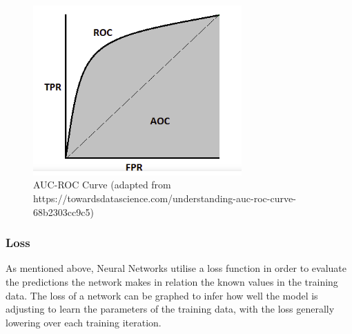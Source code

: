 \documentclass[12pt]{report}
\begin{document}
\vspace{0.5cm}
\begin{figure}[ht!]
	\centering
	\includegraphics[width=8cm]{aucroc}
	\caption{AUC-ROC Curve (adapted from https://towardsdatascience.com/understanding-auc-roc-curve-68b2303cc9c5)}
	\label{fig:aucroc}
\end{figure}

\newpage
\subsubsection{Loss}
\begin{flushleft}
As mentioned above, Neural Networks utilise a loss function in order to evaluate the predictions the network makes in relation the known values in the training data. The loss of a network can be graphed to infer how well the model is adjusting to learn the parameters of the training data, with the loss generally lowering over each training iteration.
\end{flushleft}
\end{document}
